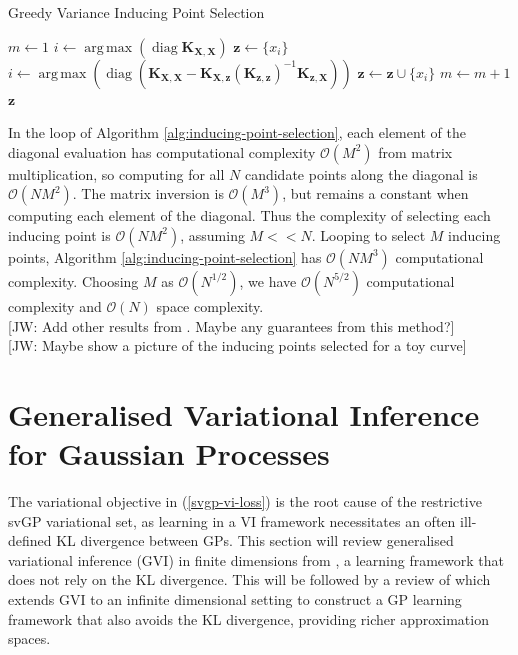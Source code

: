 \documentclass{article}
\newcommand{\jw}[1]{{\color{gray} [JW: #1]}}
\newcommand{\diag}{\operatorname{diag}}
\DeclareMathOperator*{\argmax}{arg\,max}
\numberwithin{equation}{section}
\begin{document}
\begin{algorithm}
\caption{Greedy Variance Inducing Point Selection}\label{alg:inducing-point-selection}
\begin{algorithmic}
\State $m \leftarrow 1$
 \State $i \leftarrow \argmax \left(\diag\mathbf{K}_{\mathbf{X}, \mathbf{X}}\right) $
 \State $\mathbf{z} \leftarrow \{x_i\}$
\State$i \leftarrow \argmax \left(\diag \left(\mathbf{K}_{\mathbf{X}, \mathbf{X}} - \mathbf{K}_{\mathbf{X}, \mathbf{z}} \left(\mathbf{K}_{\mathbf{z}, \mathbf{z}}\right)^{-1}\mathbf{K}_{\mathbf{z}, \mathbf{X}}\right)\right)$
 \State  $\mathbf{z} \leftarrow \mathbf{z} \cup \{x_i\}$
 \State  $m \leftarrow m+1$
\EndWhile
\State \Return $\mathbf{z}$
\end{algorithmic}
\end{algorithm}

In the loop of Algorithm \ref{alg:inducing-point-selection}, each element of the diagonal evaluation has computational complexity $\mathcal{O}(M^2)$ from matrix multiplication, so computing for all $N$ candidate points along the diagonal is $\mathcal{O}(NM^2)$.
The matrix inversion is $\mathcal{O}(M^3)$, but remains a constant when computing each element of the diagonal.
Thus the complexity of selecting each inducing point is $\mathcal{O}(NM^2)$, assuming $M << N$.
Looping to select $M$ inducing points, Algorithm \ref{alg:inducing-point-selection} has $\mathcal{O}(NM^3)$ computational complexity.
Choosing $M$ as $\mathcal{O}(N^{1/2})$, we have $\mathcal{O}(N^{5/2})$ computational complexity and $\mathcal{O}(N)$ space complexity.
\\\jw{Add other results from \cite{burt2020convergence}. Maybe any guarantees from this method?}
\\\jw{Maybe show a picture of the inducing points selected for a toy curve}

\newpage
\section{Generalised Variational Inference for Gaussian Processes}
The variational objective in (\ref{svgp-vi-loss}) is the root cause of the restrictive svGP variational set, as learning in a VI framework necessitates an often ill-defined KL divergence between GPs.
This section will review generalised variational inference (GVI) in finite dimensions from \cite{knoblauch2022optimization}, a learning framework that does not rely on the KL divergence.
This will be followed by a review of \cite{wild2022generalized} which extends GVI to an infinite dimensional setting to construct a GP learning framework that also avoids the KL divergence, providing richer approximation spaces.
\end{document}
